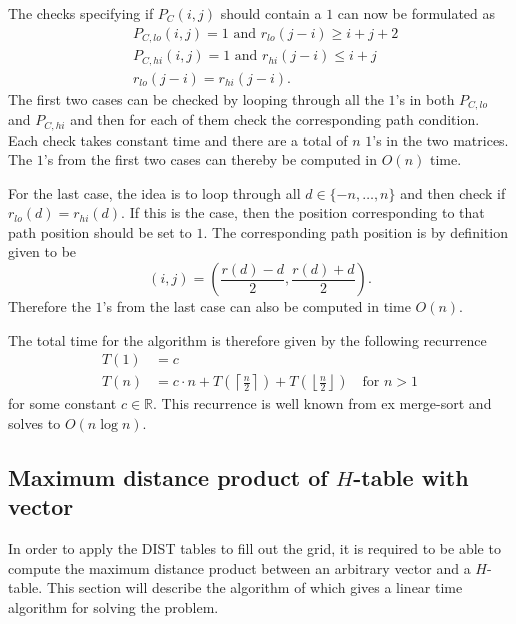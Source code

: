 \documentclass[twoside,11pt,openright]{report}
\begin{document}
%
The checks specifying if $P_C(i, j)$ should contain a $1$ can now be formulated as
\begin{align}
  &P_{C,lo}(i, j) = 1 \text{ and } r_{lo}(j - i) \geq i + j + 2 \\
  &P_{C,hi}(i, j) = 1 \text{ and } r_{hi}(j - i) \leq i + j \\
  &r_{lo}(j - i) = r_{hi}(j - i).
\end{align}
The first two cases can be checked by looping through all the $1$'s in both $P_{C,lo}$ and $P_{C,hi}$ and then for each of them check the corresponding path condition. Each check takes constant time and there are a total of $n$ $1$'s in the two matrices. The $1$'s from the first two cases can thereby be computed in $O(n)$ time.

For the last case, the idea is to loop through all $d \in \{-n, \dots, n\}$ and then check if $r_{lo}(d) = r_{hi}(d)$. If this is the case, then the position corresponding to that path position should be set to $1$. The corresponding path position is by definition given to be
\[
  (i, j) = \left( \frac{r(d) - d}{2}, \frac{r(d) + d}{2} \right).
\]
Therefore the $1$'s from the last case can also be computed in time $O(n)$.

The total time for the algorithm is therefore given by the following recurrence
\begin{align*}
  T(1) &= c \\
  T(n) &= c \cdot n + T\left(\left \lceil \frac{n}{2}\right \rceil \right) + T\left(\left \lfloor \frac{n}{2}\right \rfloor \right) \quad \text{for } n > 1
\end{align*}
for some constant $c \in \mathbb{R}$. This recurrence is well known from ex merge-sort and solves to $O(n \log{n})$.

\subsection{Maximum distance product of $H$-table with vector}
\label{sec:algorithm:max-mult-H-table-with-vector}
In order to apply the DIST tables to fill out the grid, it is required to be able to compute the maximum distance product between an arbitrary vector and a $H$-table. This section will describe the algorithm of \cite[Lemma 2, p. 234]{Gawrychowski:2012:FAC:2422024.2422048} which gives a linear time algorithm for solving the problem.
\end{document}
